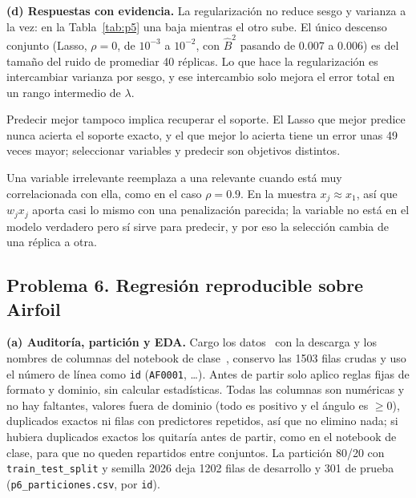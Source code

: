 \documentclass[10pt,a4paper]{article}
\begin{document}
\textbf{(d) Respuestas con evidencia.}
La regularización no reduce sesgo y varianza a la vez: en la Tabla~\ref{tab:p5} una baja mientras el otro sube. El único descenso conjunto (Lasso, $\rho=0$, de $10^{-3}$ a $10^{-2}$, con $\hat B^2$ pasando de 0.007 a 0.006) es del tamaño del ruido de promediar 40 réplicas. Lo que hace la regularización es intercambiar varianza por sesgo, y ese intercambio solo mejora el error total en un rango intermedio de $\lambda$.

Predecir mejor tampoco implica recuperar el soporte. El Lasso que mejor predice nunca acierta el soporte exacto, y el que mejor lo acierta tiene un error unas 49 veces mayor; seleccionar variables y predecir son objetivos distintos.

Una variable irrelevante reemplaza a una relevante cuando está muy correlacionada con ella, como en el caso $\rho=0.9$. En la muestra $x_j\approx x_1$, así que $w_jx_j$ aporta casi lo mismo con una penalización parecida; la variable no está en el modelo verdadero pero sí sirve para predecir, y por eso la selección cambia de una réplica a otra.

\subsection*{Problema 6. Regresión reproducible sobre Airfoil}
\textbf{(a) Auditoría, partición y EDA.}
Cargo los datos~\cite{airfoil} con la descarga y los nombres de columnas del notebook de clase~\cite{nbreg}, conservo las 1503 filas crudas y uso el número de línea como \texttt{id} (\texttt{AF0001}, \dots). Antes de partir solo aplico reglas fijas de formato y dominio, sin calcular estadísticas. Todas las columnas son numéricas y no hay faltantes, valores fuera de dominio (todo es positivo y el ángulo es $\ge0$), duplicados exactos ni filas con predictores repetidos, así que no elimino nada; si hubiera duplicados exactos los quitaría antes de partir, como en el notebook de clase, para que no queden repartidos entre conjuntos. La partición 80/20 con \texttt{train\_test\_split} y semilla 2026 deja 1202 filas de desarrollo y 301 de prueba (\texttt{p6\_particiones.csv}, por \texttt{id}).
\end{document}
